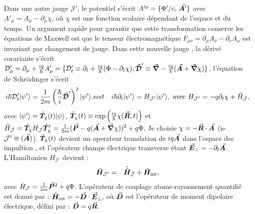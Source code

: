 Dans une autre jauge $\mathcal{J}'$, le potentiel s’écrit $A'^\mu = \{ \Phi'/c,\, \vec{{\bm{A}}}' \}$ avec $ A'_\mu = A_\mu - \partial_\mu \chi$, où $\chi$ est une fonction scalaire dépendant de l’espace et du temps. Un argument rapide pour garantir que cette transformation conserve les équations de Maxwell est que le tenseur électromagnétique
\(
F_{\mu\nu} = \partial_\mu A_\nu - \partial_\nu A_\mu
\)
est invariant par changement de jauge. Dans cette nouvelle jauge , la dérivé corariante s'écrit $\mathcal{D}_\mu' = \partial_\mu + \frac{iq}{\hbar} A_\mu' = \{ \mathcal{D}_t' \equiv \partial_t + \frac{iq}{\hbar} ( \Phi - \partial_t \chi )   , \vec{{\bm{\mathcal{D}}}}' \equiv \vec{{\bm{\nabla}}} - \frac{iq}{\hbar} (\vec{{\bm{A}}} + \vec{{\bm{\nabla}}}\chi)\} $, l’équation de Schrödinger s'écrit
\begin{eqnarray*}
	i\hbar \mathcal{D}_t' \vert \psi' \rangle = \frac{1}{2m} \left( \frac{\hbar}{i} \operatorvec{\mathcal{D}}' \right)^2 \vert \psi' \rangle, & soit &  i\hbar \partial_t \vert \psi' \rangle = H_{\mathcal{J}'} \vert \psi' \rangle , ~\mbox{avec}~	H_{\mathcal{J}'} = -q\partial_t \chi + \tilde{H}_{\mathcal{J}},%
\end{eqnarray*}
avec $\vert \psi'\rangle = \hat{\bm{T}}_\chi(t) \vert \psi\rangle$, $\hat{\bm{T}}_\chi(t) \equiv \exp\left( \frac{iq}{\hbar} \chi(\vec{{\bm{R}}}, t) \right)$ et $\tilde{H}_{\mathcal{J}} = \hat{\bm{T}}_\chi H_{\mathcal{J}}\hat{\bm{T}}_\chi^\dag = \frac{1}{2m} ( \vec{{\bm{P}}} - q  ( \vec{{\bm{A}}} + \vec{{\bm{\nabla}}}\chi  )  )^2 + q \Phi $. Je choisie $\chi = - \vec{{\bm{R}}}\cdot\vec{{\bm{A}}}$ (ie $\mathcal{J}' \equiv (\vec{{\bm{A}}})$). $\hat{\bm{T}}_\chi(t)$ devient un operateur translation de $iq \vec{{\bm{A}}}$ dans l’espace des impultion , et l'opérateur champs électrique transverse étant $\vec{{\bm{E}}}_\perp = - \partial_t \vec{{\bm{A}}}$. L'Hamiltonien $H_{\mathcal{J}'}$ devient :
\begin{eqnarray*}
	\hat{\bm{H}}_{\mathcal{J}'} & = & 	\tilde{\hat{\bm{H}}}_{\mathcal{J}}	+ \hat{\bm{H}}_{\text{int}},
\end{eqnarray*}
avec $\tilde{H}_{\mathcal{J}} = \frac{1}{2m}\vec{{\bm{P}}}^2 +q \Phi$. L’opérateur de couplage atome-rayonnement quantifié est donné par :
\(
\hat{\bm{H}}_{\text{int}} = - \vec{{\bm{D}}} \cdot \vec{{\bm{E}}}_\perp,
\)
où \(\vec{{\bm{D}}}\) est l’opérateur de moment dipolaire électrique, défini par :
\(
\vec{{\bm{D}}} = q \vec{{\bm{R}}}.
\)



